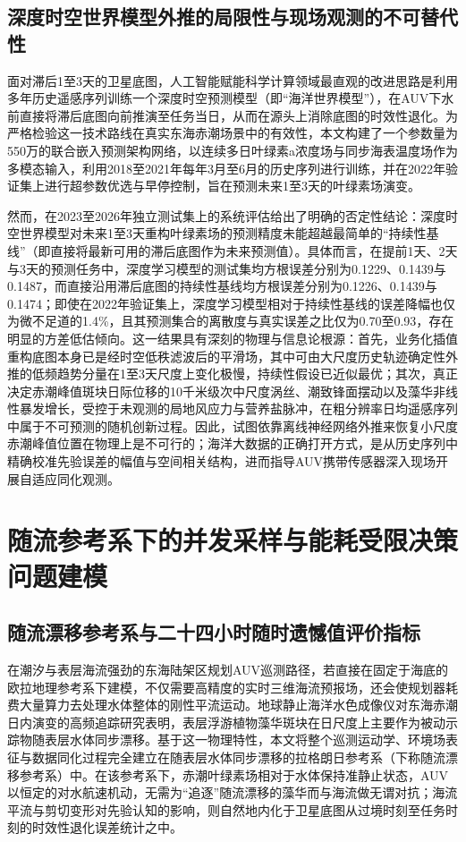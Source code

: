 \subsection{深度时空世界模型外推的局限性与现场观测的不可替代性}

面对滞后1至3天的卫星底图，人工智能赋能科学计算领域最直观的改进思路是利用多年历史遥感序列训练一个深度时空预测模型（即“海洋世界模型”），在AUV下水前直接将滞后底图向前推演至任务当日，从而在源头上消除底图的时效性退化。为严格检验这一技术路线在真实东海赤潮场景中的有效性，本文构建了一个参数量为550万的联合嵌入预测架构网络\cite{assran2025vjepa2}，以连续多日叶绿素a浓度场与同步海表温度场\cite{chin2017mur}作为多模态输入，利用2018至2021年每年3月至6月的历史序列进行训练，并在2022年验证集上进行超参数优选与早停控制，旨在预测未来1至3天的叶绿素场演变。

然而，在2023至2026年独立测试集上的系统评估给出了明确的否定性结论：深度时空世界模型对未来1至3天重构叶绿素场的预测精度未能超越最简单的“持续性基线”（即直接将最新可用的滞后底图作为未来预测值）。具体而言，在提前1天、2天与3天的预测任务中，深度学习模型的测试集均方根误差分别为0.1229、0.1439与0.1487，而直接沿用滞后底图的持续性基线均方根误差分别为0.1226、0.1439与0.1474；即使在2022年验证集上，深度学习模型相对于持续性基线的误差降幅也仅为微不足道的1.4\%，且其预测集合的离散度与真实误差之比仅为0.70至0.93，存在明显的方差低估倾向。这一结果具有深刻的物理与信息论根源：首先，业务化插值重构底图本身已是经时空低秩滤波后的平滑场，其中可由大尺度历史轨迹确定性外推的低频趋势分量在1至3天尺度上变化极慢，持续性假设已近似最优；其次，真正决定赤潮峰值斑块日际位移的10千米级次中尺度涡丝、潮致锋面摆动以及藻华非线性暴发增长，受控于未观测的局地风应力与营养盐脉冲，在粗分辨率日均遥感序列中属于不可预测的随机创新过程。因此，试图依靠离线神经网络外推来恢复小尺度赤潮峰值位置在物理上是不可行的；海洋大数据的正确打开方式，是从历史序列中精确校准先验误差的幅值与空间相关结构，进而指导AUV携带传感器深入现场开展自适应同化观测。

\section{随流参考系下的并发采样与能耗受限决策问题建模}

\subsection{随流漂移参考系与二十四小时随时遗憾值评价指标}

在潮汐与表层海流强劲的东海陆架区规划AUV巡测路径，若直接在固定于海底的欧拉地理参考系下建模，不仅需要高精度的实时三维海流预报场，还会使规划器耗费大量算力去处理水体整体的刚性平流运动。地球静止海洋水色成像仪对东海赤潮日内演变的高频追踪研究表明，表层浮游植物藻华斑块在日尺度上主要作为被动示踪物随表层水体同步漂移\cite{lou2014diurnal}。基于这一物理特性，本文将整个巡测运动学、环境场表征与数据同化过程完全建立在随表层水体同步漂移的拉格朗日参考系（下称随流漂移参考系）中。在该参考系下，赤潮叶绿素场相对于水体保持准静止状态，AUV以恒定的对水航速机动，无需为“追逐”随流漂移的藻华而与海流做无谓对抗；海流平流与剪切变形对先验认知的影响，则自然地内化于卫星底图从过境时刻至任务时刻的时效性退化误差统计之中。

